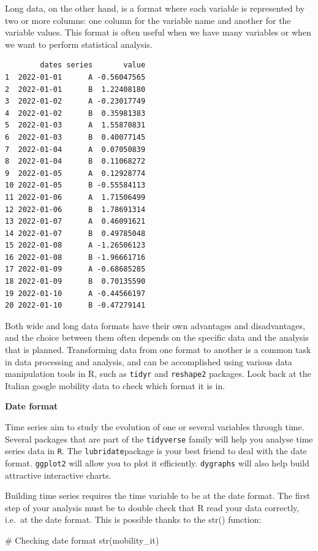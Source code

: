 \documentclass[
  letterpaper,
  DIV=11,
  numbers=noendperiod]{scrreprt}
\newenvironment{Shaded}{\begin{snugshade}}{\end{snugshade}}
\newcommand{\CommentTok}[1]{\textcolor[rgb]{0.37,0.37,0.37}{#1}}
\newcommand{\FunctionTok}[1]{\textcolor[rgb]{0.28,0.35,0.67}{#1}}
\newcommand{\NormalTok}[1]{\textcolor[rgb]{0.00,0.23,0.31}{#1}}
\begin{document}
Long data, on the other hand, is a format where each variable is
represented by two or more columns: one column for the variable name and
another for the variable values. This format is often useful when we
have many variables or when we want to perform statistical analysis.

\begin{verbatim}
        dates series       value
1  2022-01-01      A -0.56047565
2  2022-01-01      B  1.22408180
3  2022-01-02      A -0.23017749
4  2022-01-02      B  0.35981383
5  2022-01-03      A  1.55870831
6  2022-01-03      B  0.40077145
7  2022-01-04      A  0.07050839
8  2022-01-04      B  0.11068272
9  2022-01-05      A  0.12928774
10 2022-01-05      B -0.55584113
11 2022-01-06      A  1.71506499
12 2022-01-06      B  1.78691314
13 2022-01-07      A  0.46091621
14 2022-01-07      B  0.49785048
15 2022-01-08      A -1.26506123
16 2022-01-08      B -1.96661716
17 2022-01-09      A -0.68685285
18 2022-01-09      B  0.70135590
19 2022-01-10      A -0.44566197
20 2022-01-10      B -0.47279141
\end{verbatim}

Both wide and long data formats have their own advantages and
disadvantages, and the choice between them often depends on the specific
data and the analysis that is planned. Transforming data from one format
to another is a common task in data processing and analysis, and can be
accomplished using various data manipulation tools in R, such as
\texttt{tidyr} and \texttt{reshape2} packages. Look back at the Italian
google mobility data to check which format it is in.

\textbf{Date format}

Time series aim to study the evolution of one or several variables
through time. Several packages that are part of the \texttt{tidyverse}
family will help you analyse time series data in \texttt{R}. The
\texttt{lubridate}package is your best friend to deal with the date
format. \texttt{ggplot2} will allow you to plot it efficiently.
\texttt{dygraphs} will also help build attractive interactive charts.

Building time series requires the time variable to be at the date
format. The first step of your analysis must be to double check that R
read your data correctly, i.e.~at the date format. This is possible
thanks to the str() function:

\begin{Shaded}
\begin{Highlighting}[]
\CommentTok{\# Checking date format}
\FunctionTok{str}\NormalTok{(mobility\_it)}
\end{Highlighting}
\end{Shaded}
\end{document}
